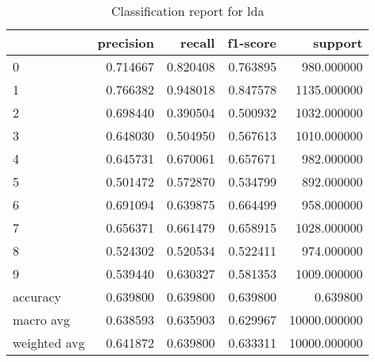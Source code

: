 \begin{table}[htb!]
\centering
\caption{Classification report for lda}
\label{tab:classification-report-lda}
\begin{tabular}{lrrrr}
\toprule
 & precision & recall & f1-score & support \\
\midrule
0 & 0.714667 & 0.820408 & 0.763895 & 980.000000 \\
1 & 0.766382 & 0.948018 & 0.847578 & 1135.000000 \\
2 & 0.698440 & 0.390504 & 0.500932 & 1032.000000 \\
3 & 0.648030 & 0.504950 & 0.567613 & 1010.000000 \\
4 & 0.645731 & 0.670061 & 0.657671 & 982.000000 \\
5 & 0.501472 & 0.572870 & 0.534799 & 892.000000 \\
6 & 0.691094 & 0.639875 & 0.664499 & 958.000000 \\
7 & 0.656371 & 0.661479 & 0.658915 & 1028.000000 \\
8 & 0.524302 & 0.520534 & 0.522411 & 974.000000 \\
9 & 0.539440 & 0.630327 & 0.581353 & 1009.000000 \\
accuracy & 0.639800 & 0.639800 & 0.639800 & 0.639800 \\
macro avg & 0.638593 & 0.635903 & 0.629967 & 10000.000000 \\
weighted avg & 0.641872 & 0.639800 & 0.633311 & 10000.000000 \\
\bottomrule
\end{tabular}
\end{table}
